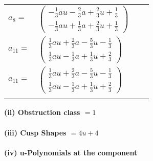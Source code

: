 \documentclass[1p]{elsarticle_modified}
\theoremstyle{definition}
\begin{document}
\begin{tabular}{m{7pt} m{180pt} m{7pt} m{180pt} }
\flushright $a_{8}=$&$\begin{pmatrix}-\frac{1}{3} a u-\frac{2}{3} a+\frac{2}{3} u+\frac{1}{3}\\-\frac{1}{3} a u+\frac{1}{3} a+\frac{2}{3} u+\frac{1}{3}\end{pmatrix}$ \\
\flushright $a_{11}=$&$\begin{pmatrix}\frac{1}{3} a u+\frac{2}{3} a-\frac{5}{3} u-\frac{1}{3}\\\frac{1}{3} a u-\frac{1}{3} a+\frac{1}{3} u+\frac{2}{3}\end{pmatrix}$\\ \flushright $a_{11}=$&$\begin{pmatrix}\frac{1}{3} a u+\frac{2}{3} a-\frac{5}{3} u-\frac{1}{3}\\\frac{1}{3} a u-\frac{1}{3} a+\frac{1}{3} u+\frac{2}{3}\end{pmatrix}$\\&\end{tabular}
\flushleft \textbf{(ii) Obstruction class $= 1$}\\~\\
\flushleft \textbf{(iii) Cusp Shapes $= 4 u+4$}\\~\\
\newpage\renewcommand{\arraystretch}{1}
\flushleft \textbf{(iv) u-Polynomials at the component}\newline \\
\end{document}
